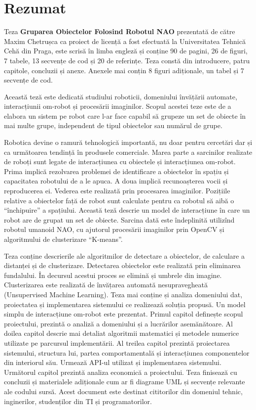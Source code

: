 \section*{Rezumat}

Teza \textbf{Gruparea Obiectelor Folosind Robotul NAO} prezentată de către Maxim Chetrușca ca proiect de licență a fost efectuată la Universitatea Tehnică Cehă din Praga, este scrisă în limba engleză și conține 90 de pagini, 26 de figuri, 7 tabele, 13 secvențe de cod și 20 de referințe. Teza constă din introducere, patru capitole, concluzii și anexe. Anexele mai conțin 8 figuri adiționale, un tabel și 7 secvențe de cod.

Această teză este dedicată studiului roboticii, domeniului învățării automate, interacțiunii om-robot și procesării imaginilor. Scopul acestei teze este de a elabora un sistem pe robot care l-ar face capabil să grupeze un set de obiecte în mai multe grupe, independent de tipul obiectelor sau numărul de grupe. 

Robotica devine o ramură tehnologică importantă, nu doar pentru cercetări dar și ca următoarea tendință în produsele comerciale. Marea parte a sarcinilor realizate de roboți sunt legate de interacțiunea cu obiectele și interacțiunea om-robot. Prima implică rezolvarea problemei de identificare a obiectelor în spațiu și capacitatea robotului de a le apuca. A doua implică recunoașterea vocii și reproducerea ei. Vederea este realizată prin procesarea imaginilor. Pozițiile relative a obiectelor față de robot sunt calculate pentru ca robotul să aibă o ``închipuire'' a spațiului. Această teză descrie un model de interacțiune în care un robot are de grupat un set de obiecte. Sarcina dată este îndeplinită utilizînd robotul umanoid NAO, cu ajutorul procesării imaginilor prin OpenCV și algoritmului de clusterizare ``K-means''. 

Teza conține descrierile ale algoritmilor de detectare a obiectelor, de calculare a distanței și de clusterizare. Detectarea obiectelor este realizată prin eliminarea fundalului. În decursul acestui proces se elimină și umbrele din imagine. Clusterizarea este realizată de învățarea automată nesupravegheată (Unsupervised Machine Learning). Teza mai conține și analiza domeniului dat, proiectatea și implementarea sistemului ce realizează soluția propusă. Un model simplu de interacțiune om-robot este prezentat. Primul capitol definește scopul proiectului, prezintă o analiză a domeniului și a lucrărilor asemănătoare. Al doilea capitol descrie mai detaliat algoritmii matematici și metodele numerice utilizate pe parcursul implementării. Al treilea capitol prezintă proiectarea sistemului, structura lui, partea comportamentală și interacțiunea componentelor din interiorul său. Urmează API-ul utilizat și implementarea sistemului. Următorul capitol prezintă analiza economică a proiectului. Teza finisează cu concluzii și materialele adiționale cum ar fi diagrame UML și secvențe relevante ale codului sursă. Acest document este destinat cititorilor din domeniul tehnic, inginerilor, studenților din TI și programatorilor.